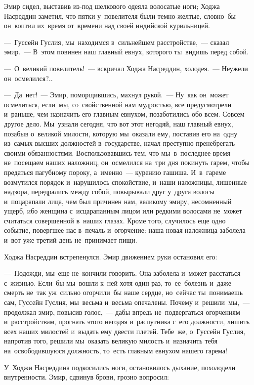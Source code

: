 \documentclass[12pt,a4paper]{book}
\begin{document}
Эмир сидел, выставив из-под шелкового одеяла волосатые ноги; Ходжа Насреддин заметил, что пятки у~повелителя были темно-желтые, словно~бы он~коптил их~время от~времени над своей индийской курильницей.

—~Гуссейн Гуслия, мы~находимся в~сильнейшем расстройстве,~— сказал эмир.~— В~этом повинен наш главный евнух, которого ты~видишь перед собой.

—~О~великий повелитель!~— вскричал Ходжа Насреддин, холодея.~— Неужели он~осмелился?..

—~Да~нет!~— Эмир, поморщившись, махнул рукой.~— Ну~как он~может осмелиться, если~мы, со~свойственной нам мудростью, все предусмотрели и~раньше, чем назначить его главным евнухом, позаботились обо всем. Совсем другое дело. Мы~узнали сегодня, что вот этот негодяй, наш главный евнух, позабыв о~великой милости, которую мы~оказали ему, поставив его на~одну из~самых высших должностей в~государстве, начал преступно пренебрегать своими обязанностями. Воспользовавшись тем, что мы~в~последнее время не~посещаем наших наложниц, он~осмелился на~три дня покинуть гарем, чтобы предаться пагубному пороку, а~именно~— курению гашиша. И~в~гареме возмутился порядок и~нарушилось спокойствие, и~наши наложницы, лишенные надзора, передрались между собой, повырывали друг у~друга волосы и~поцарапали лица, чем был причинен нам, великому эмиру, несомненный ущерб, ибо женщина с~исцарапанным лицом или редкими волосами не~может считаться совершенной в~наших глазах. Кроме того, случилось еще одно событие, повергшее нас в~печаль и~огорчение: наша новая наложница заболела и~вот уже третий день не~принимает пищи.

Ходжа Насреддин встрепенулся. Эмир движением руки остановил его:

—~Подожди, мы~еще не~кончили говорить. Она заболела и~может расстаться с~жизнью. Если~бы мы~вошли к~ней хотя один раз, то~ее~болезнь и~даже смерть не~так уж~сильно огорчили~бы наше сердце, но~сейчас ты~понимаешь сам, Гуссейн Гуслия, мы~весьма и~весьма опечалены. Почему и~решили~мы,~— продолжал эмир, повысив голос,~— дабы впредь не~подвергаться огорчениям и~расстройствам, прогнать этого негодяя и~распутника с~его должности, лишить всех наших милостей и~выдать ему двести плетей. Тебе~же, о~Гуссейн Гуслия, напротив того, решили мы~оказать великую милость и~назначить тебя на~освободившуюся должность, то~есть главным евнухом нашего гарема!

У~Ходжи Насреддина подкосились ноги, остановилось дыхание, похолодели внутренности. Эмир, сдвинув брови, грозно вопросил:
\end{document}
